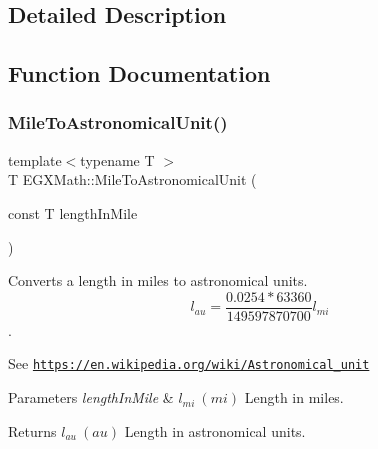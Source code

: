 \subsection{Detailed Description}


\subsection{Function Documentation}
\mbox{\label{group___e_g_x_math-_conversions-_length_conversions-_imperial-_mile-_astronomical_gae83082376f6746dd5f85433daad42331}} 
\subsubsection{\texorpdfstring{Mile\+To\+Astronomical\+Unit()}{MileToAstronomicalUnit()}}
{\footnotesize\ttfamily template$<$typename T $>$ \\
T E\+G\+X\+Math\+::\+Mile\+To\+Astronomical\+Unit (\begin{DoxyParamCaption}\item[{const T}]{length\+In\+Mile }\end{DoxyParamCaption})}



Converts a length in miles to astronomical units. \[ l_{au}=\frac{0.0254 * 63360}{149597870700} l_{mi} \]. 

See \href{https://en.wikipedia.org/wiki/Astronomical_unit}{\tt https\+://en.\+wikipedia.\+org/wiki/\+Astronomical\+\_\+unit} 
\begin{DoxyParams}{Parameters}
{\em length\+In\+Mile} & $ l_{mi}\ (mi)$ Length in miles. \\
\hline
\end{DoxyParams}
\begin{DoxyReturn}{Returns}
$ l_{au}\ (au)$ Length in astronomical units. 
\end{DoxyReturn}
\mbox{\label{group___e_g_x_math-_conversions-_length_conversions-_imperial-_mile-_astronomical_ga45c1f0177f23bf7b798344319fb86909}} 
